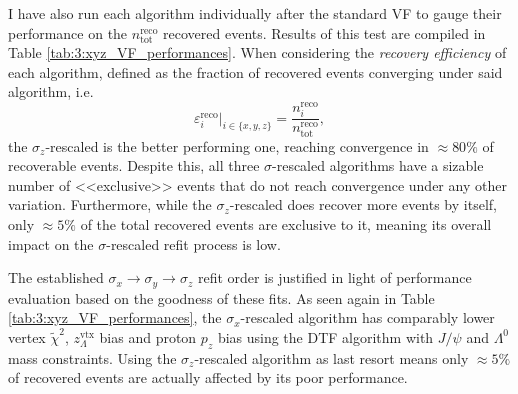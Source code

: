 I have also run each algorithm individually after the standard VF to gauge their performance on the $n^\text{reco}_\text{tot}$ recovered events.
Results of this test are compiled in Table \ref{tab:3:xyz_VF_performances}.
When considering the \textit{recovery efficiency} of each algorithm, defined as the fraction of recovered events converging under said algorithm, i.e.
\begin{equation}
	\varepsilon^\text{reco}_i \rvert_{i\in\{x,y,z\}} = \frac{n_i^\text{reco}}{n_\text{tot}^\text{reco}},
\end{equation}
the $\sigma_z$-rescaled is the better performing one, reaching convergence in $\approx 80\%$ of recoverable events.
Despite this, all three $\sigma$-rescaled algorithms have a sizable number of <<exclusive>> events that do not reach convergence under any other variation.
Furthermore, while the $\sigma_z$-rescaled does recover more events by itself, only $\approx 5\%$ of the total recovered events are exclusive to it, meaning its overall impact on the $\sigma$-rescaled refit process is low.

The established $\sigma_x \rightarrow \sigma_y \rightarrow \sigma_z$ refit order is justified in light of performance evaluation based on the goodness of these fits.
As seen again in Table \ref{tab:3:xyz_VF_performances}, the $\sigma_x$-rescaled algorithm has comparably lower vertex $\tilde{\chi}^2$, $z_\Lambda^\text{vtx}$ bias and proton $p_z$ bias using the DTF algorithm with $J/\psi$ and $\Lambda^0$ mass constraints.
Using the $\sigma_z$-rescaled algorithm as last resort means only $\approx 5\%$ of recovered events are actually affected by its poor performance.

%

